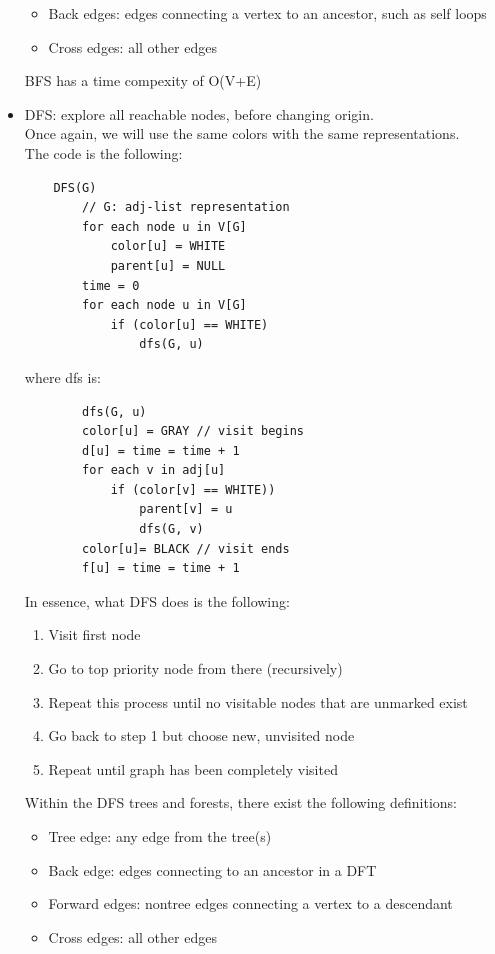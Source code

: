\documentclass[nobib]{tufte-handout}
\begin{document}
\begin{itemize}
\begin{itemize}
        \item Back edges: edges connecting a vertex to an ancestor, such as self loops
        \item Cross edges: all other edges
    \end{itemize}
    BFS has a time compexity of O(V+E)
    \item DFS: explore all reachable nodes, before changing origin.\\
    Once again, we will use the same colors with the same representations.\\
    The code is the following:
    \begin{lstlisting}
    DFS(G)
        // G: adj-list representation
        for each node u in V[G]
            color[u] = WHITE
            parent[u] = NULL
        time = 0
        for each node u in V[G]
            if (color[u] == WHITE)
                dfs(G, u)
    \end{lstlisting}
    where dfs is:
    \begin{lstlisting}
        dfs(G, u)
        color[u] = GRAY // visit begins
        d[u] = time = time + 1
        for each v in adj[u]
            if (color[v] == WHITE))
                parent[v] = u
                dfs(G, v)
        color[u]= BLACK // visit ends
        f[u] = time = time + 1
    \end{lstlisting}
    In essence, what DFS does is the following:
    \begin{enumerate}
        \item Visit first node
        \item Go to top priority node from there (recursively)
        \item Repeat this process until no visitable nodes that are unmarked exist
        \item Go back to step 1 but choose new, unvisited node
        \item Repeat until graph has been completely visited
    \end{enumerate}
    Within the DFS trees and forests, there exist the following definitions:
    \begin{itemize}
        \item Tree edge: any edge from the tree(s)
        \item Back edge: edges connecting to an ancestor in a DFT
        \item Forward edges: nontree edges connecting a vertex to a descendant
        \item Cross edges: all other edges
    \end{itemize}
\end{itemize}
\end{document}
